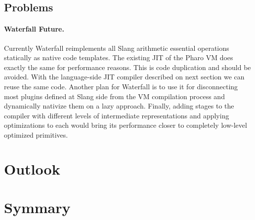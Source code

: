 \subsection{Problems}
\paragraph{Waterfall Future.}
Currently Waterfall reimplements all Slang arithmetic essential operations statically as native code templates.
The existing JIT of the Pharo VM does exactly the same for performance reasons.
This is code duplication and should be avoided.
With the language-side JIT compiler described on next section we can reuse the same code. Another plan for Waterfall is to use it for disconnecting most plugins defined at Slang side from the VM compilation process and dynamically nativize them on a lazy approach.
Finally, adding stages to the compiler with different levels of intermediate representations and applying optimizations to each would bring its performance closer to completely low-level optimized primitives.


\section{Outlook}


\section{Symmary}


